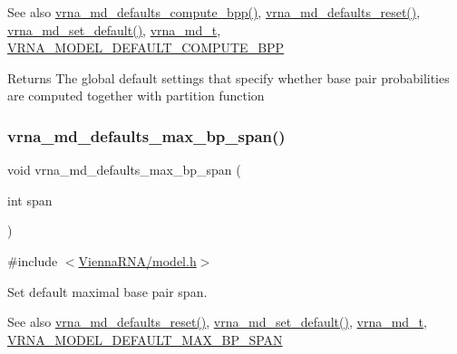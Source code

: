 \begin{DoxySeeAlso}{See also}
\mbox{\hyperlink{group__model__details_gaf1b5db10f1f476767f9a95f8a78e3132}{vrna\+\_\+md\+\_\+defaults\+\_\+compute\+\_\+bpp()}}, \mbox{\hyperlink{group__model__details_ga70834424cf804d149937de89f80ceb45}{vrna\+\_\+md\+\_\+defaults\+\_\+reset()}}, \mbox{\hyperlink{group__model__details_ga8ac6ff84936282436f822644bf841f66}{vrna\+\_\+md\+\_\+set\+\_\+default()}}, \mbox{\hyperlink{group__model__details_ga1f8a10e12a0a1915f2a4eff0b28ea17c}{vrna\+\_\+md\+\_\+t}}, \mbox{\hyperlink{group__model__details_ga1d6cd5051940b126c248147c011bac6c}{V\+R\+N\+A\+\_\+\+M\+O\+D\+E\+L\+\_\+\+D\+E\+F\+A\+U\+L\+T\+\_\+\+C\+O\+M\+P\+U\+T\+E\+\_\+\+B\+PP}} 
\end{DoxySeeAlso}
\begin{DoxyReturn}{Returns}
The global default settings that specify whether base pair probabilities are computed together with partition function 
\end{DoxyReturn}
\mbox{\label{group__model__details_ga4c4bc962f09b4480cb8499f1cf8ae4ec}} 
\subsubsection{\texorpdfstring{vrna\_md\_defaults\_max\_bp\_span()}{vrna\_md\_defaults\_max\_bp\_span()}}
{\footnotesize\ttfamily void vrna\+\_\+md\+\_\+defaults\+\_\+max\+\_\+bp\+\_\+span (\begin{DoxyParamCaption}\item[{int}]{span }\end{DoxyParamCaption})}



{\ttfamily \#include $<$\mbox{\hyperlink{model_8h}{Vienna\+R\+N\+A/model.\+h}}$>$}



Set default maximal base pair span. 

\begin{DoxySeeAlso}{See also}
\mbox{\hyperlink{group__model__details_ga70834424cf804d149937de89f80ceb45}{vrna\+\_\+md\+\_\+defaults\+\_\+reset()}}, \mbox{\hyperlink{group__model__details_ga8ac6ff84936282436f822644bf841f66}{vrna\+\_\+md\+\_\+set\+\_\+default()}}, \mbox{\hyperlink{group__model__details_ga1f8a10e12a0a1915f2a4eff0b28ea17c}{vrna\+\_\+md\+\_\+t}}, \mbox{\hyperlink{group__model__details_ga7cb6f4ae8fdebff6746a4410814f2977}{V\+R\+N\+A\+\_\+\+M\+O\+D\+E\+L\+\_\+\+D\+E\+F\+A\+U\+L\+T\+\_\+\+M\+A\+X\+\_\+\+B\+P\+\_\+\+S\+P\+AN}} 
\end{DoxySeeAlso}

